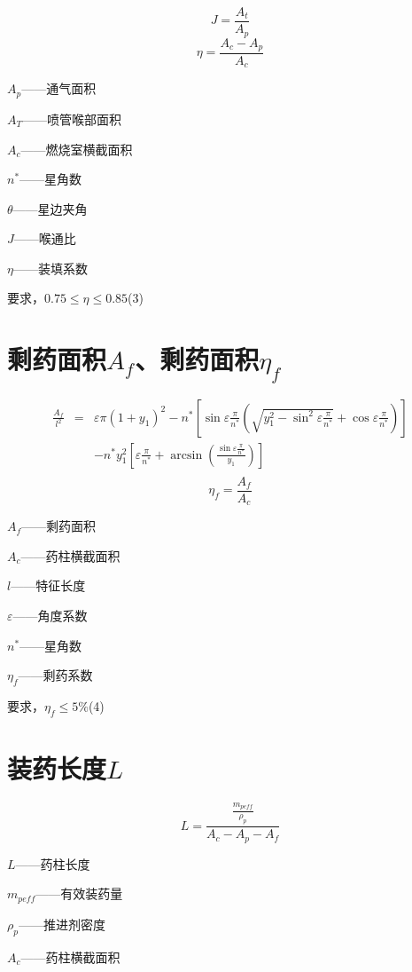\endgroup

\[
J=\frac{A_{t}}{A_{p}}
\]
\[
  \eta =\frac{A_c-A_p}{A_c}
\]

$A_{p}$——通气面积

$A_{T}$——喷管喉部面积

$A_{c}$——燃烧室横截面积

$n^*$——星角数

$\theta$——星边夹角

$J$——喉通比

$\eta$——装填系数

要求，$0.75\leqslant \eta \leqslant 0.85$\hspace{1em}(3)

\section{剩药面积$A_{f}$、剩药面积\texorpdfstring{$\eta_{f}$}{}}
\begingroup
\fontsize{16}{14}\selectfont 
\[
  \begin{array}{ccl}
    \frac{A_f}{l^2}&		=&		\varepsilon \pi \left( 1+y_1 \right) ^2-n^*\left[ \sin \varepsilon \frac{\pi}{n^*}\left( \sqrt{y_{1}^{2}-\sin ^2\varepsilon \frac{\pi}{n^*}}+\cos \varepsilon \frac{\pi}{n^*} \right) \right]\\[1.5em]
    &		&		-n^*y_{1}^{2}\left[ \varepsilon \frac{\pi}{n^*}+\arcsin\left( \frac{\sin \varepsilon \frac{\pi}{n^*}}{y_1} \right) \right]\\
  \end{array}\]
  \endgroup
\[
\eta _f=\frac{A_f}{A_c}
\]

$A_{f}$——剩药面积

$A_{c}$——药柱横截面积

$l$——特征长度

$\varepsilon$——角度系数

$n^*$——星角数

$\eta_{f}$——剩药系数

要求，$\eta _f\leqslant5\%$\hspace{1em}(4)

  \section{装药长度$L$}
\[
L=\frac{\frac{m_{peff}}{\rho _p}}{A_c-A_p-A_f}
\]

$L$——药柱长度

$m_{peff}$——有效装药量

$\rho_{p}$——推进剂密度

$A_{c}$——药柱横截面积

